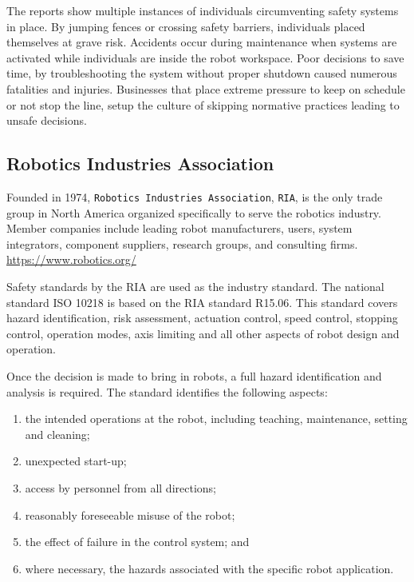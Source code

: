 The reports show multiple instances of individuals circumventing safety
systems in place. By jumping fences or crossing safety barriers,
individuals placed themselves at grave risk. Accidents occur during
maintenance when systems are activated while individuals are inside the
robot workspace. Poor decisions to save time, by troubleshooting the
system without proper shutdown caused numerous fatalities and injuries.
Businesses that place extreme pressure to keep on schedule or not stop
the line, setup the culture of skipping normative practices leading to
unsafe decisions.

\hypertarget{robotics-industries-association}{%
\subsection{Robotics Industries
Association}\label{robotics-industries-association}}

Founded in 1974, \texttt{Robotics\ Industries\ Association},
\texttt{RIA}, is the only trade group in North America organized
specifically to serve the robotics industry. Member companies include
leading robot manufacturers, users, system integrators, component
suppliers, research groups, and consulting firms.
\url{https://www.robotics.org/}

Safety standards by the RIA are used as the industry standard. The
national standard ISO 10218 is based on the RIA standard R15.06. This
standard covers hazard identification, risk assessment, actuation
control, speed control, stopping control, operation modes, axis limiting
and all other aspects of robot design and operation.

Once the decision is made to bring in robots, a full hazard
identification and analysis is required. The standard identifies the
following aspects:

\begin{enumerate}
\tightlist
\item
  the intended operations at the robot, including teaching, maintenance,
  setting and cleaning;
\item
  unexpected start-up;
\item
  access by personnel from all directions;
\item
  reasonably foreseeable misuse of the robot;
\item
  the effect of failure in the control system; and
\item
  where necessary, the hazards associated with the specific robot
  application.
\end{enumerate}

